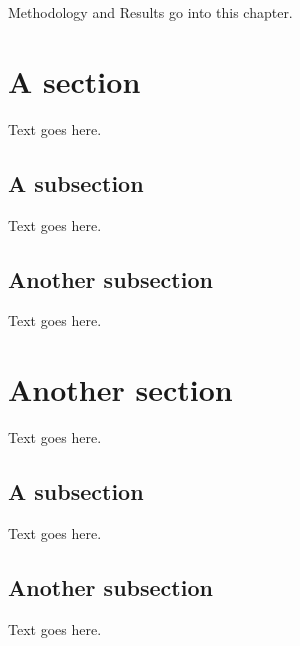 Methodology and Results go into this chapter.


\section{A section}
Text goes here.

\subsection{A subsection}
Text goes here.

\subsection{Another subsection}
Text goes here.


\section{Another section}
Text goes here.

\subsection{A subsection}
Text goes here.

\subsection{Another subsection}
Text goes here.
